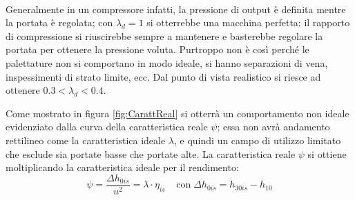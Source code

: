 \\Generalmente in un compressore infatti, la pressione di output è definita mentre la portata è regolata; con $\lambda_d = 1$ si otterrebbe una macchina perfetta: il rapporto di compressione si riuscirebbe sempre a mantenere e basterebbe regolare la portata per ottenere la pressione voluta. Purtroppo non è così perché le palettature non si comportano in modo ideale, si hanno separazioni di vena, inspessimenti di strato limite, ecc. Dal punto di vista realistico si riesce ad ottenere $0.3<\lambda_d<0.4$.

Come mostrato in figura \ref{fig:CarattReal} si otterrà un comportamento non ideale evidenziato dalla curva della caratteristica reale $\psi$; essa non avrà andamento rettilineo come la caratteristica ideale $\lambda$, e quindi un campo di utilizzo limitato che esclude sia portate basse che portate alte. La caratteristica reale $\psi$ si ottiene moltiplicando la caratteristica ideale per il rendimento:
\begin{equation}
\psi = \frac{\Delta h_{0is}}{u^2} = \lambda \cdot \eta_{is} \;\;\;\; \text{con}\; \Delta h_{0is} = h_{30is} - h_{10}
\end{equation}

